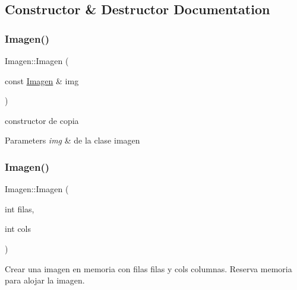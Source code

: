\subsection{Constructor \& Destructor Documentation}
\mbox{\label{classImagen_aebf637b27aa4c1bcefbec6b61f28a1b2}} 
\subsubsection{\texorpdfstring{Imagen()}{Imagen()}\hspace{0.1cm}{\footnotesize\ttfamily [1/3]}}
{\footnotesize\ttfamily Imagen\+::\+Imagen (\begin{DoxyParamCaption}\item[{const \hyperlink{classImagen}{Imagen} \&}]{img }\end{DoxyParamCaption})}



constructor de copia 


\begin{DoxyParams}{Parameters}
{\em img} & de la clase imagen \\
\hline
\end{DoxyParams}
\mbox{\label{classImagen_ad4943ff0e2de31d4c25a879030f3ebf2}} 
\subsubsection{\texorpdfstring{Imagen()}{Imagen()}\hspace{0.1cm}{\footnotesize\ttfamily [2/3]}}
{\footnotesize\ttfamily Imagen\+::\+Imagen (\begin{DoxyParamCaption}\item[{int}]{filas,  }\item[{int}]{cols }\end{DoxyParamCaption})}



Crear una imagen en memoria con filas filas y cols columnas. Reserva memoria para alojar la imagen. 



